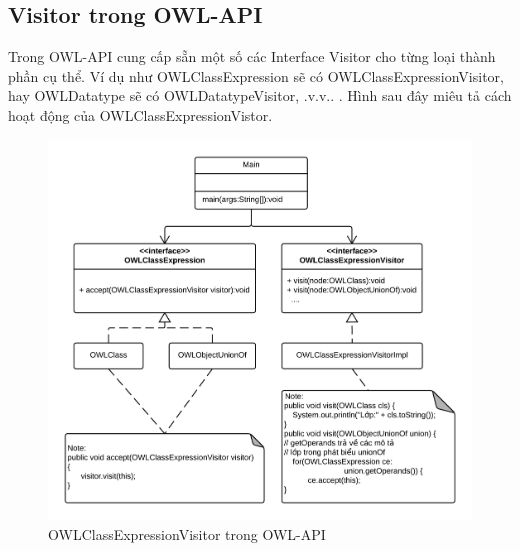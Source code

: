 \subsection{Visitor trong OWL-API}
Trong OWL-API cung cấp sẵn một số các Interface Visitor cho từng loại thành phần cụ thể. Ví dụ như OWLClassExpression sẽ có OWLClassExpressionVisitor, hay OWLDatatype sẽ có OWLDatatypeVisitor, .v.v.. . Hình sau đây miêu tả cách hoạt động của OWLClassExpressionVistor.
\begin{figure}[h!]
	\centering
	\includegraphics[width=145mm]{Figures/uml_classdiagram_classexpressionvistior_nobackground.png}
	\caption{OWLClassExpressionVisitor trong OWL-API \label{overflow}}
\end{figure}
